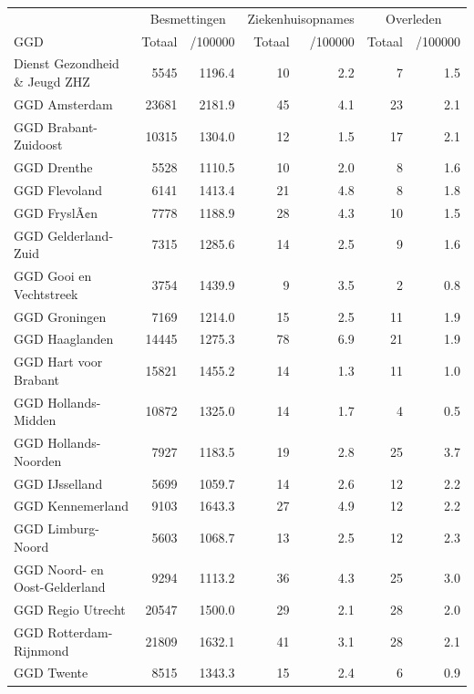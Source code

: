 \documentclass[
  english,
  man,floatsintext]{apa6}
\begin{document}
\begin{table}
\centering\begingroup\fontsize{10}{12}\selectfont

\begin{threeparttable}
\begin{tabular}{lrrrrrr}
\toprule
\multicolumn{1}{c}{ } & \multicolumn{2}{c}{Besmettingen} & \multicolumn{2}{c}{Ziekenhuisopnames} & \multicolumn{2}{c}{Overleden} \\
\cmidrule(l{3pt}r{3pt}){2-3} \cmidrule(l{3pt}r{3pt}){4-5} \cmidrule(l{3pt}r{3pt}){6-7}
GGD & Totaal & /100000 & Totaal & /100000 & Totaal & /100000\\
\midrule
Dienst Gezondheid \& Jeugd ZHZ & 5545 & 1196.4 & 10 & 2.2 & 7 & 1.5\\
GGD Amsterdam & 23681 & 2181.9 & 45 & 4.1 & 23 & 2.1\\
GGD Brabant-Zuidoost & 10315 & 1304.0 & 12 & 1.5 & 17 & 2.1\\
GGD Drenthe & 5528 & 1110.5 & 10 & 2.0 & 8 & 1.6\\
GGD Flevoland & 6141 & 1413.4 & 21 & 4.8 & 8 & 1.8\\
GGD FryslÃ¢n & 7778 & 1188.9 & 28 & 4.3 & 10 & 1.5\\
GGD Gelderland-Zuid & 7315 & 1285.6 & 14 & 2.5 & 9 & 1.6\\
GGD Gooi en Vechtstreek & 3754 & 1439.9 & 9 & 3.5 & 2 & 0.8\\
GGD Groningen & 7169 & 1214.0 & 15 & 2.5 & 11 & 1.9\\
GGD Haaglanden & 14445 & 1275.3 & 78 & 6.9 & 21 & 1.9\\
GGD Hart voor Brabant & 15821 & 1455.2 & 14 & 1.3 & 11 & 1.0\\
GGD Hollands-Midden & 10872 & 1325.0 & 14 & 1.7 & 4 & 0.5\\
GGD Hollands-Noorden & 7927 & 1183.5 & 19 & 2.8 & 25 & 3.7\\
GGD IJsselland & 5699 & 1059.7 & 14 & 2.6 & 12 & 2.2\\
GGD Kennemerland & 9103 & 1643.3 & 27 & 4.9 & 12 & 2.2\\
GGD Limburg-Noord & 5603 & 1068.7 & 13 & 2.5 & 12 & 2.3\\
GGD Noord- en Oost-Gelderland & 9294 & 1113.2 & 36 & 4.3 & 25 & 3.0\\
GGD Regio Utrecht & 20547 & 1500.0 & 29 & 2.1 & 28 & 2.0\\
GGD Rotterdam-Rijnmond & 21809 & 1632.1 & 41 & 3.1 & 28 & 2.1\\
GGD Twente & 8515 & 1343.3 & 15 & 2.4 & 6 & 0.9\\

\end{tabular}
\end{threeparttable}
\end{table}
\end{document}
